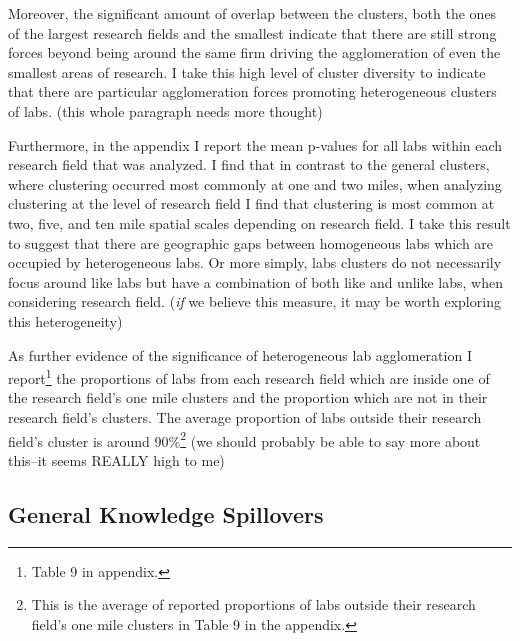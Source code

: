 \documentclass[12pt,letterpaper]{article}
\begin{document}
\par
Moreover, the significant amount of overlap between the clusters, both the ones of the largest research fields and the smallest indicate that there are still strong forces beyond being around the same firm driving the agglomeration of even the smallest areas of research. I take this high level of cluster diversity to indicate that there are particular agglomeration forces promoting heterogeneous clusters of labs. {\color{blue}(this whole paragraph needs more thought)}
\par 
Furthermore, in the appendix I report the mean p-values for all labs within each research field that was analyzed. I find that in contrast to the general clusters, where clustering occurred most commonly at one and two miles, when analyzing clustering at the level of research field I find that clustering is most common at two, five, and ten mile spatial scales depending on research field. I take this result to suggest that there are geographic gaps between homogeneous labs which are occupied by heterogeneous labs. Or more simply, labs clusters do not necessarily focus around like labs but have a combination of both like and unlike labs, when considering research field. {\color{blue}(\emph{if} we believe this measure, it may be worth exploring this heterogeneity)}
\par
As further evidence of the significance of heterogeneous lab agglomeration I report\footnote{Table 9 in appendix.} the proportions of labs from each research field which are inside one of the research field's one mile clusters and the proportion which are not in their research field's clusters. The average proportion of labs outside their research field's cluster is around 90\%\footnote{This is the average of reported proportions of labs outside their research field's one mile clusters in Table 9 in the appendix.} {\color{blue}(we should probably be able to say more about this--it seems REALLY high to me)}

\subsection{General Knowledge Spillovers}
 
\end{document}
